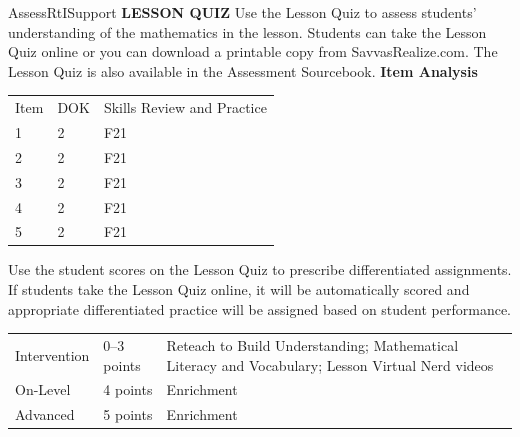 \documentclass{article}
\newenvironment{te-addendum}[2]{}{}     %
\begin{document}
\begin{te-addendum}{Assess}{RtISupport}
\textbf{LESSON QUIZ}
Use the Lesson Quiz to assess students' understanding of the mathematics in the lesson.
Students can take the Lesson Quiz online or you can download a printable copy from SavvasRealize.com. The Lesson Quiz is also available in the Assessment Sourcebook.
\textbf{Item Analysis}
\begin{tabular}{lll}
Item & DOK & Skills Review and Practice \\
1 & 2 & F21 \\
2 & 2 & F21 \\
3 & 2 & F21 \\
4 & 2 & F21 \\
5 & 2 & F21 \\
\end{tabular}
Use the student scores on the Lesson Quiz to prescribe differentiated assignments.
If students take the Lesson Quiz online, it will be automatically scored and appropriate differentiated practice will be assigned based on student performance.
\begin{tabular}{lll}
Intervention & 0--3 points & Reteach to Build Understanding; Mathematical Literacy and Vocabulary; Lesson Virtual Nerd videos \\
On-Level & 4 points & Enrichment \\
Advanced & 5 points & Enrichment \\
\end{tabular}
\end{te-addendum}
\end{document}
